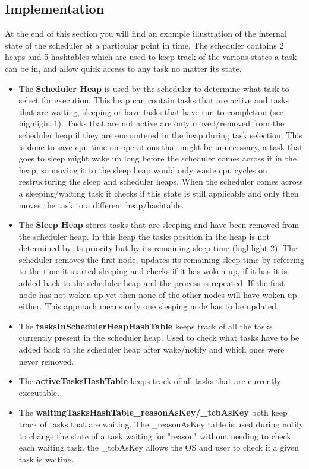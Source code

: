 \documentclass[12pt,a4paper]{article}
\begin{document}
\subsection{Implementation}
At the end of this section you will find an example illustration of the internal state of the scheduler at a particular point in time. The scheduler contains 2 heaps and 5 hashtables which are used to keep track of the various states a task can be in, and allow quick access to any task no matter its state.

\begin{itemize}
\setlength\itemsep{0.0em}
  \item The \textbf{Scheduler Heap} is used by the scheduler to determine what task to select for execution. This heap can contain tasks that are active and tasks that are waiting, sleeping or have tasks that have run to completion (see highlight 1). Tasks that are not active are only moved/removed from the scheduler heap if they are encountered in the heap during task selection. This is done to save cpu time on operations that might be unnecessary, a task that goes to sleep might wake up long before the scheduler comes across it in the heap, so moving it to the sleep heap would only waste cpu cycles on restructuring the sleep and scheduler heaps. When the scheduler comes across a sleeping/waiting task it checks if this state is still applicable and only then moves the task to a different heap/hashtable.
  \item The \textbf{Sleep Heap} stores tasks that are sleeping and have been removed from the scheduler heap. In this heap the tasks position in the heap is not determined by its priority but by its remaining sleep time (highlight 2). The scheduler removes the first node, updates its remaining sleep time by referring to the time it started sleeping and checks if it has woken up, if it has it is added back to the scheduler heap and the process is repeated. If the first node has not woken up yet then none of the other nodes will have woken up either. This approach means only one sleeping node has to be updated.
  \item The \textbf{tasksInSchedulerHeapHashTable} keeps track of all the tasks currently present in the scheduler heap. Used to check what tasks have to be added back to the scheduler heap after wake/notify and which ones were never removed.
  \item The \textbf{activeTasksHashTable} keeps track of all tasks that are currently executable.
  \item The \textbf{waitingTasksHashTable\_reasonAsKey/\_tcbAsKey} both keep track of tasks that are waiting. The \_reasonAsKey table is used during notify to change the state of a task waiting for "reason" without needing to check each waiting task. the \_tcbAsKey allows the OS and user to check if a given task is waiting.

\end{itemize}
\end{document}
